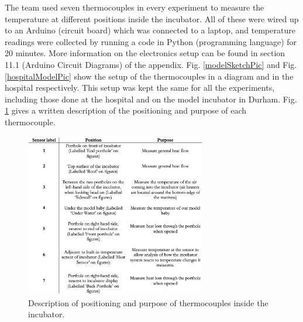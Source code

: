 \documentclass{article}
\begin{document}
The team used seven thermocouples in every experiment to measure the temperature at different positions inside the incubator. All of these were wired up to an Arduino (circuit board) which was connected to a laptop, and temperature readings were collected by running a code in Python (programming language) for 20 minutes. More information on the electronics setup can be found in section 11.1 (Arduino Circuit Diagrams) of the appendix. Fig. \ref{modelSketchPic} and Fig. \ref{hospitalModelPic} show the setup of the thermocouples in a diagram and in the hospital respectively. This setup was kept the same for all the experiments, including those done at the hospital and on the model incubator in Durham. Fig. \ref{Positioning of thermocouples} gives a written description of the positioning and purpose of each thermocouple.

\vspace{3mm}

\begin{figure}[h!]
    \centering
    \captionsetup{justification=centering,margin=1cm}
    \includegraphics[width = 0.7\textwidth]{Positioning of thermocouples.png}
    \caption{Description of positioning and purpose of thermocouples inside the incubator.}
    \label{Positioning of thermocouples}
\end{figure}
\end{document}
